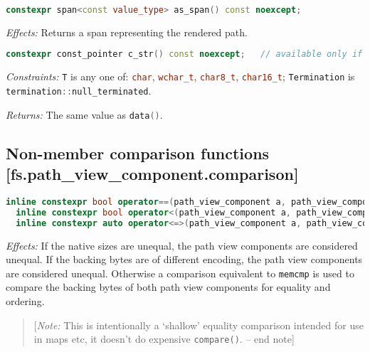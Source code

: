\documentclass[11pt]{article}
\newcommand{\code}[2][cpp]{\lstinline[language=#1,basicstyle=\small\ttfamily]{#2}}
\newcommand{\desc}[1]{\textit{#1}}
\newcommand{\constraints}{\desc{Constraints: }}
\newcommand{\effects}{\desc{Effects: }}
\newcommand{\returns}{\desc{Returns: }}
\newcommand{\note}[1]{\begin{quote}[\textit{Note:} #1 -- end note]\end{quote}}
\begin{document}
\begin{lstlisting}[language=cpp]
    constexpr span<const value_type> as_span() const noexcept;
\end{lstlisting}

\effects Returns a span representing the rendered path.\\


\begin{lstlisting}[language=cpp]
    constexpr const_pointer c_str() const noexcept;   // available only if null_terminated and non-byte backing
\end{lstlisting}

\constraints \code{T} is any one of: \code{char}, \code{wchar_t}, \code{char8_t}, \code{char16_t}; \code{Termination} is \code{termination::null_terminated}.

\returns The same value as \code{data()}.\\

\subsection*{Non-member comparison functions [fs.path\_view\_component.comparison]}

\begin{lstlisting}[language=cpp]
  inline constexpr bool operator==(path_view_component a, path_view_component b) noexcept;
  inline constexpr bool operator<(path_view_component a, path_view_component b) noexcept;
  inline constexpr auto operator<=>(path_view_component a, path_view_component b) = default;
\end{lstlisting}

\effects If the native sizes are unequal, the path view components are considered unequal. If the backing bytes are of different encoding, the path view components are considered unequal. Otherwise a comparison equivalent to \code{memcmp} is used to compare the backing bytes of both path view components for equality and ordering.
\color{black}

\note{This is intentionally a `shallow' equality comparison intended for use in maps etc, it doesn't do expensive \code{compare()}.}

\color{darkgreen}
\end{document}
